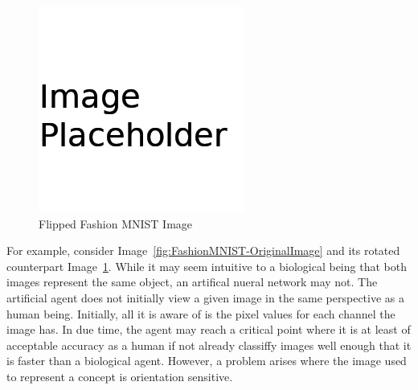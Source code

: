 \documentclass[conference]{IEEEtran}
\begin{document}
\begin{figure}[H]
  \centering
  \includegraphics[width=0.8\linewidth]{figures/placeholder.png}
  \caption{Flipped Fashion MNIST Image~\cite{fashion_mnist}}%
  \label{fig:FashionMNIST-RotatedImage}
\end{figure}

For example, consider Image~\ref{fig:FashionMNIST-OriginalImage} and its rotated
counterpart Image~\ref{fig:FashionMNIST-RotatedImage}. While it may seem
intuitive to a biological being that both images represent the same object, an
artifical nueral network may not. The artificial agent does not initially view a
given image in the same perspective as a human being. Initially, all it is aware
of is the pixel values for each channel the image has. In due time, the agent
may reach a critical point where it is at least of acceptable accuracy as a
human if not already classiffy images well enough that it is faster than a
biological agent. However, a problem arises where the image used to represent a
concept is orientation sensitive.
\end{document}
